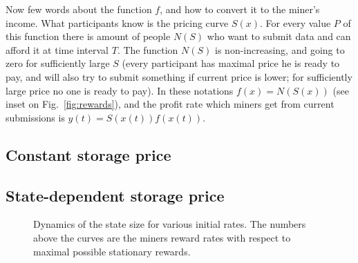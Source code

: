 \documentclass[]{llncs}   %
\begin{document}
Now few words about the function $f$, and how to convert it to the miner's
income. What participants know is the pricing curve $S(x)$. For every value $P$
of this function there is amount of people $N(S)$ who want to submit data and
can afford it at time interval $T$. The function $N(S)$ is non-increasing, and
going to zero for sufficiently large $S$ (every participant has maximal price he
is ready to pay, and will also try to submit something if current price is
lower; for sufficiently large price no one is ready to pay). In these notations
$f(x)=N(S(x))$ (see inset on Fig.~\ref{fig:rewards}), and the profit rate which
miners get from current submissions is $y(t) = S(x(t))f(x(t))$.

\subsection{Constant storage price}
\subsection{State-dependent storage price}
\begin{figure}
    
    \caption{
        \label{fig:dynamics} Dynamics of the state size for various initial
        rates. The numbers above the curves are the miners reward rates with
        respect to maximal possible stationary rewards.
    }
\end{figure}
\end{document}
